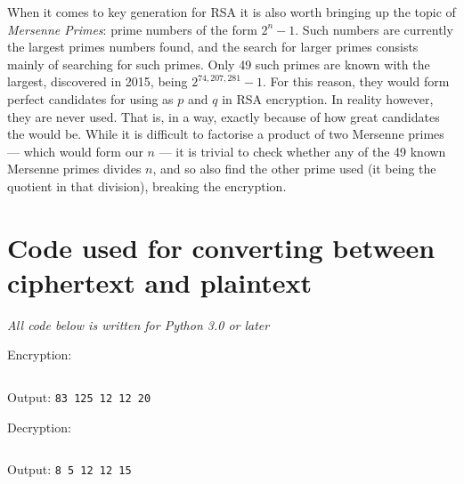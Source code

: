 \documentclass[12pt, titlepage]{article}
\let\oldsection\section
\renewcommand\section{\clearpage\oldsection}
\begin{document}
When it comes to key generation for RSA it is also worth bringing up the topic of
\emph{Mersenne Primes}:\autocite[33]{dence} prime numbers of the form $2^n - 1$. Such
numbers are currently the largest primes numbers found, and the search for larger primes
consists mainly of searching for such primes. Only 49 such primes are known with the
largest, discovered in 2015, being $2^{74,207,281} - 1$.\autocite{newscientist_mersenne} For
this reason, they would form perfect candidates for using as $p$ and $q$ in RSA encryption.
In reality however, they are never used. That is, in a way, exactly because of how great
candidates the would be. While it is difficult to factorise a product of two Mersenne primes
--- which would form our $n$ --- it is trivial to check whether any of the 49 known Mersenne
primes divides $n$, and so also find the other prime used (it being the quotient in that
division), breaking the encryption.

\printbibliography

\appendix

\section{Code used for converting between ciphertext and plaintext}
\label{sec:code_appendix}

\textit{All code below is written for Python 3.0 or later}

Encryption: \vspace{-5mm}
\inputminted{python}{encrypt.py}
\vspace{-5mm}
Output: \texttt{83 125 12 12 20}

Decryption: \vspace{-5mm}
\inputminted{python}{decrypt.py}
\vspace{-5mm}
Output: \texttt{8 5 12 12 15}
\end{document}
